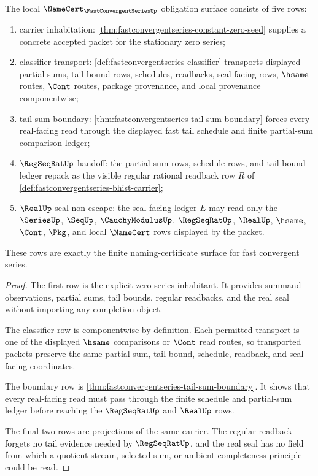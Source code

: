 \begin{theorem}
\label{thm:fastconvergentseries-namecert-obligation-surface}
The local $\NameCert_{\FastConvergentSeriesUp}$ obligation surface consists of five rows:
\begin{enumerate}
\item carrier inhabitation: \autoref{thm:fastconvergentseries-constant-zero-seed} supplies a concrete accepted packet for the stationary zero series;
\item classifier transport: \autoref{def:fastconvergentseries-classifier} transports displayed partial sums, tail-bound rows, schedules, readbacks, seal-facing rows, $\hsame$ routes, $\Cont$ routes, package provenance, and local provenance componentwise;
\item tail-sum boundary: \autoref{thm:fastconvergentseries-tail-sum-boundary} forces every real-facing read through the displayed fast tail schedule and finite partial-sum comparison ledger;
\item $\RegSeqRatUp$ handoff: the partial-sum rows, schedule rows, and tail-bound ledger repack as the visible regular rational readback row $R$ of \autoref{def:fastconvergentseries-bhist-carrier};
\item $\RealUp$ seal non-escape: the seal-facing ledger $E$ may read only the $\SeriesUp$, $\SeqUp$, $\CauchyModulusUp$, $\RegSeqRatUp$, $\RealUp$, $\hsame$, $\Cont$, $\Pkg$, and local $\NameCert$ rows displayed by the packet.
\end{enumerate}
These rows are exactly the finite naming-certificate surface for fast convergent series.
\end{theorem}
\begin{proof}
The first row is the explicit zero-series inhabitant. It provides summand observations, partial sums, tail bounds, regular readbacks, and the real seal without importing any completion object.

The classifier row is componentwise by definition. Each permitted transport is one of the displayed $\hsame$ comparisons or $\Cont$ read routes, so transported packets preserve the same partial-sum, tail-bound, schedule, readback, and seal-facing coordinates.

The boundary row is \autoref{thm:fastconvergentseries-tail-sum-boundary}. It shows that every real-facing read must pass through the finite schedule and partial-sum ledger before reaching the $\RegSeqRatUp$ and $\RealUp$ rows.

The final two rows are projections of the same carrier. The regular readback forgets no tail evidence needed by $\RegSeqRatUp$, and the real seal has no field from which a quotient stream, selected sum, or ambient completeness principle could be read.
\end{proof}

